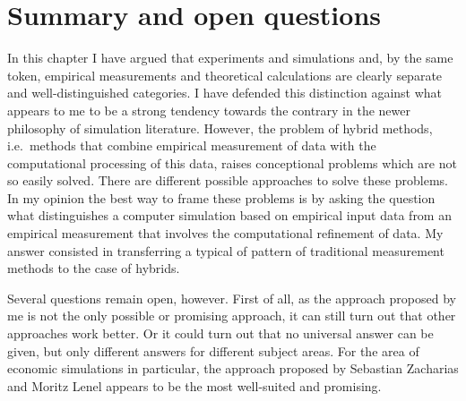 \documentclass[12pt, a4paper]{article}
\numberwithin{equation}{section}
\begin{document}


\section{Summary and open questions}

In this chapter I have argued that experiments and simulations and, by the same token, empirical measurements and theoretical calculations are clearly separate and well-distinguished categories. I have defended this distinction against what appears to me to be a strong tendency towards the contrary in the newer philosophy of simulation literature. However, the problem of hybrid methods, i.e.\ methods that combine empirical measurement of data with the computational processing of this data, raises conceptional problems which are not so easily solved. There are different possible approaches to solve these problems. In my opinion the best way to frame these problems is by asking the question what distinguishes a computer simulation based on empirical input data from an empirical measurement that involves the computational refinement of data. My answer consisted in transferring a typical of pattern of traditional measurement methods to the case of hybrids.

Several questions remain open, however. First of all, as the approach proposed by me is not the only possible or promising approach, it can still turn out that other approaches work better. Or it could turn out that no universal answer can be given, but only different answers for different subject areas. For the area of economic simulations in particular, the approach proposed by Sebastian Zacharias and Moritz Lenel appears to be the most well-suited and promising.
\end{document}
